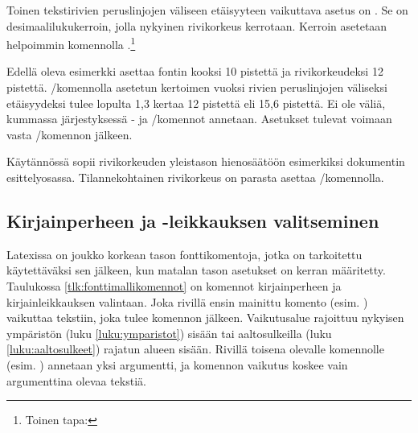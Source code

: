Toinen tekstirivien peruslinjojen väliseen etäisyyteen vaikuttava asetus
on . Se on desimaalilukukerroin, jolla
nykyinen rivikorkeus kerrotaan. Kerroin asetetaan helpoimmin komennolla
.\footnote{Toinen tapa: }

\begin{koodilohkosis}
  \fontsize{10bp}{12bp} \linespread{1.3} \selectfont
\end{koodilohkosis}

Edellä oleva esimerkki asettaa fontin kooksi 10 pistettä ja
rivikorkeudeksi 12 pistettä. \-/komennolla
asetetun kertoimen vuoksi rivien peruslinjojen väliseksi etäisyydeksi
tulee lopulta 1,3 kertaa 12 pistettä eli 15,6 pistettä. Ei ole väliä,
kummassa järjestyksessä - ja \-/komennot annetaan. Asetukset tulevat voimaan vasta
\-/komennon jälkeen.

Käytännössä  sopii rivikorkeuden yleistason
hienosäätöön esimerkiksi dokumentin esittelyosassa. Tilannekohtainen
rivikorkeus on parasta asettaa \-/komennolla.

\subsection{Kirjainperheen ja -leikkauksen valitseminen}
\label{luku:fontit_korkea}

Latexissa on joukko korkean tason fonttikomentoja, jotka on tarkoitettu
käytettäväksi sen jälkeen, kun matalan tason asetukset on kerran
määritetty. Taulukossa \ref{tlk:fonttimallikomennot} on komennot
kirjainperheen ja kirjainleikkauksen valintaan. Joka rivillä ensin
mainittu komento (esim. ) vaikuttaa
tekstiin, joka tulee komennon jälkeen. Vaikutus\-alue rajoittuu nykyisen
ympäristön (luku \ref{luku:ymparistot}) sisään tai aaltosulkeilla (luku
\ref{luku:aaltosulkeet}) rajatun alueen sisään. Rivillä toisena olevalle
komennolle (esim. ) annetaan yksi
argumentti, ja komennon vaikutus koskee vain argumenttina olevaa
tekstiä.

\providecommand{\rivi}{}
\renewcommand{\rivi}[4]{%
  \koodi{\keno #1} & \koodi{\keno #2\{\ldots\}} & #3 & #4 \\}

